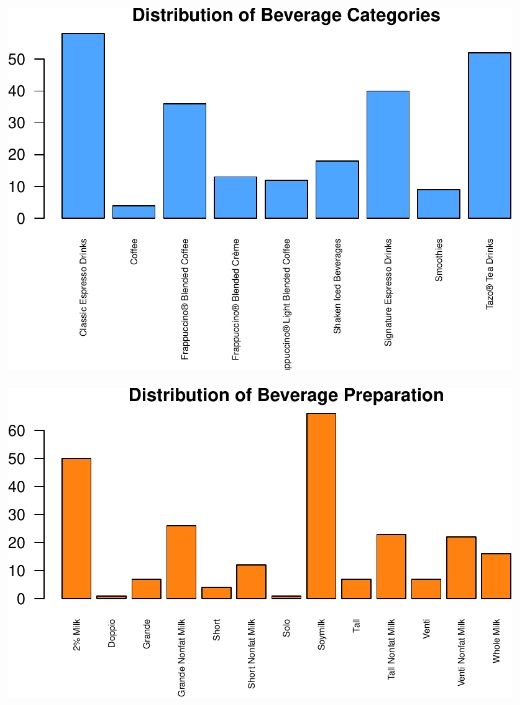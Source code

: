 \documentclass[
]{article}
\newenvironment{Shaded}{\begin{snugshade}}{\end{snugshade}}
\newcommand{\AttributeTok}[1]{\textcolor[rgb]{0.13,0.29,0.53}{#1}}
\newcommand{\DecValTok}[1]{\textcolor[rgb]{0.00,0.00,0.81}{#1}}
\newcommand{\FloatTok}[1]{\textcolor[rgb]{0.00,0.00,0.81}{#1}}
\newcommand{\FunctionTok}[1]{\textcolor[rgb]{0.13,0.29,0.53}{\textbf{#1}}}
\newcommand{\NormalTok}[1]{#1}
\newcommand{\SpecialCharTok}[1]{\textcolor[rgb]{0.81,0.36,0.00}{\textbf{#1}}}
\newcommand{\StringTok}[1]{\textcolor[rgb]{0.31,0.60,0.02}{#1}}
\begin{document}
\begin{center}\includegraphics{Statistical_Learning_Final_Report_files/figure-latex/beverage_barplot-1} \end{center}

\begin{Shaded}
\end{Shaded}

\begin{center}\includegraphics{Statistical_Learning_Final_Report_files/figure-latex/beverage_barplot-2} \end{center}
\end{document}
